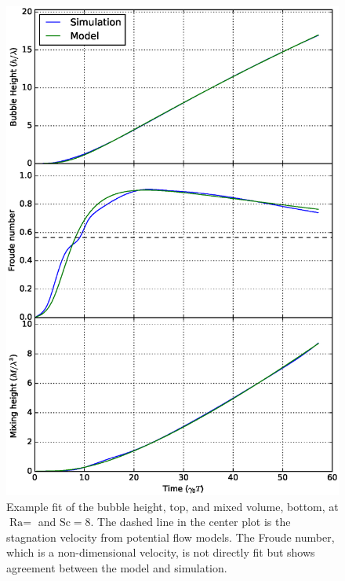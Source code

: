 \begin{figure}
\centering
\includegraphics[height=0.9\textheight]{figs/H-8-1}
\caption{ 
  Example fit of the bubble height, top, and mixed volume, bottom, at $\text{Ra} = $ and $\text{Sc} = 8$.
  The dashed line in the center plot is the stagnation velocity from potential flow models.
  The Froude number, which is a non-dimensional velocity, is not directly fit but shows agreement between the model and simulation.
}
\end{figure}

